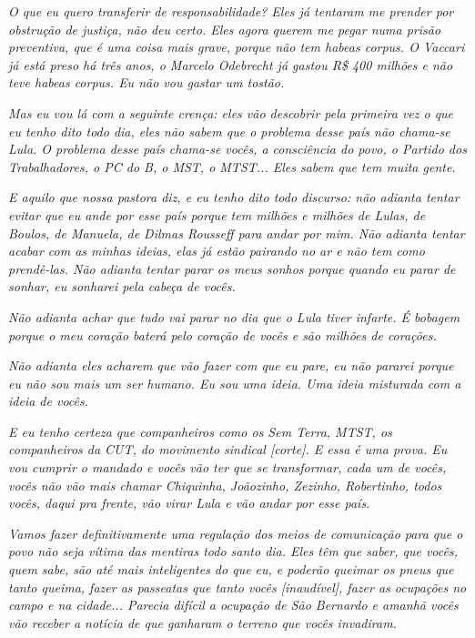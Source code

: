 \emph{O que eu quero transferir de responsabilidade? Eles já tentaram me
prender por obstrução de justiça, não deu certo. Eles agora querem me
pegar numa prisão preventiva, que é uma coisa mais grave, porque não tem
habeas corpus. O Vaccari já está preso há três anos, o Marcelo Odebrecht
já gastou R\$ 400 milhões e não teve habeas corpus. Eu não vou gastar um
tostão.}

\emph{Mas eu vou lá com a seguinte crença: eles vão descobrir pela
primeira vez o que eu tenho dito todo dia, eles não sabem que o problema
desse país não chama-se Lula. O problema desse país chama-se vocês, a
consciência do povo, o Partido dos Trabalhadores, o PC do B, o MST, o
MTST... Eles sabem que tem muita gente.}

\emph{E aquilo que nossa pastora diz, e eu tenho dito todo discurso: não
adianta tentar evitar que eu ande por esse país porque tem milhões e
milhões de Lulas, de Boulos, de Manuela, de Dilmas Rousseff para andar
por mim. Não adianta tentar acabar com as minhas ideias, elas já estão
pairando no ar e não tem como prendê-las. Não adianta tentar parar os
meus sonhos porque quando eu parar de sonhar, eu sonharei pela cabeça de
vocês.~}

\emph{Não adianta achar que tudo vai parar no dia que o Lula tiver
infarte. É bobagem porque o meu coração baterá pelo coração de vocês e
são milhões de corações.}

\emph{Não adianta eles acharem que vão fazer com que eu pare, eu não
pararei porque eu não sou mais um ser humano. Eu sou uma ideia. Uma
ideia misturada com a ideia de vocês.}

\emph{E eu tenho certeza que companheiros como os Sem Terra, MTST, os
companheiros da CUT, do movimento sindical {[}corte{]}. E essa é uma
prova. Eu vou cumprir o mandado e vocês vão ter que se transformar, cada
um de vocês, vocês não vão mais chamar Chiquinha, Joãozinho, Zezinho,
Robertinho, todos vocês, daqui pra frente, vão virar Lula e vão andar
por esse país.~}

\emph{Vamos fazer definitivamente uma regulação dos meios de comunicação
para que o povo não seja vítima das mentiras todo santo dia. Eles têm
que saber, que vocês, quem sabe, são até mais inteligentes do que eu, e
poderão queimar os pneus que tanto queima, fazer as passeatas que tanto
vocês {[}inaudível{]}, fazer as ocupações no campo e na cidade...
Parecia difícil a ocupação de São Bernardo e amanhã vocês vão receber a
notícia de que ganharam o terreno que vocês invadiram.}

